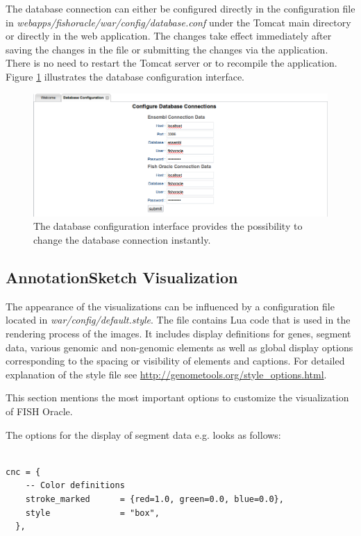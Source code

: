 \documentclass[11pt,final]{article}
\begin{document}
The database connection can either be configured directly in the configuration
file in \textit{webapps/fishoracle/war/config/database.conf} under the 
Tomcat main directory or directly in the web application.
The changes take effect immediately after saving the changes in the file or
submitting the changes via the application. There is no need to restart the 
Tomcat server or to recompile the application. Figure \ref{fig:dbconfig} illustrates 
the database configuration interface.

\begin{figure}[h]
	\begin{center}
		\includegraphics[width=\textwidth]{fig/dbconfig.png}
	\end{center}
	\caption{The database configuration interface provides the possibility
	         to change the database connection instantly.}
	\label{fig:dbconfig}
\end{figure}

\subsection{AnnotationSketch Visualization}

The appearance of the visualizations can be influenced by a configuration file
located in \textit{war/config/default.style}. The file contains Lua code that 
is used in the rendering process of the images. It includes display 
definitions for genes, segment data, various genomic and non-genomic elements
as well as global display options corresponding to the spacing or visibility 
of elements and captions. For detailed explanation of the style file see 
\url{http://genometools.org/style_options.html}. 

This section mentions the most important options to customize the 
visualization of FISH Oracle.

The options for the display of segment data e.g. looks as follows:
\begin{verbatim}

cnc = {
    -- Color definitions
    stroke_marked      = {red=1.0, green=0.0, blue=0.0},
    style              = "box",
  }, 

\end{verbatim}
\end{document}
